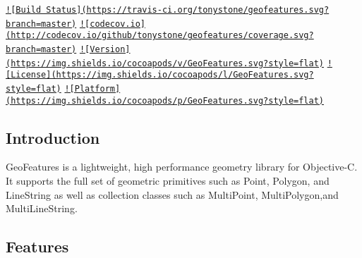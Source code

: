 \href{https://travis-ci.org/tonystone/geofeatures}{\tt !\mbox{[}Build Status\mbox{]}(https\+://travis-\/ci.\+org/tonystone/geofeatures.\+svg?branch=master)} \href{http://codecov.io/github/tonystone/geofeatures?branch=master}{\tt !\mbox{[}codecov.\+io\mbox{]}(http\+://codecov.\+io/github/tonystone/geofeatures/coverage.\+svg?branch=master)} \href{http://cocoapods.org/pods/GeoFeatures}{\tt !\mbox{[}Version\mbox{]}(https\+://img.\+shields.\+io/cocoapods/v/\+Geo\+Features.\+svg?style=flat)} \href{http://cocoapods.org/pods/GeoFeatures}{\tt !\mbox{[}License\mbox{]}(https\+://img.\+shields.\+io/cocoapods/l/\+Geo\+Features.\+svg?style=flat)} \href{http://cocoapods.org/pods/GeoFeatures}{\tt !\mbox{[}Platform\mbox{]}(https\+://img.\+shields.\+io/cocoapods/p/\+Geo\+Features.\+svg?style=flat)}

\subsection*{Introduction}

Geo\+Features is a lightweight, high performance geometry library for Objective-\/\+C. It supports the full set of geometric primitives such as Point, Polygon, and Line\+String as well as collection classes such as Multi\+Point, Multi\+Polygon,and Multi\+Line\+String.



\subsection*{Features}


